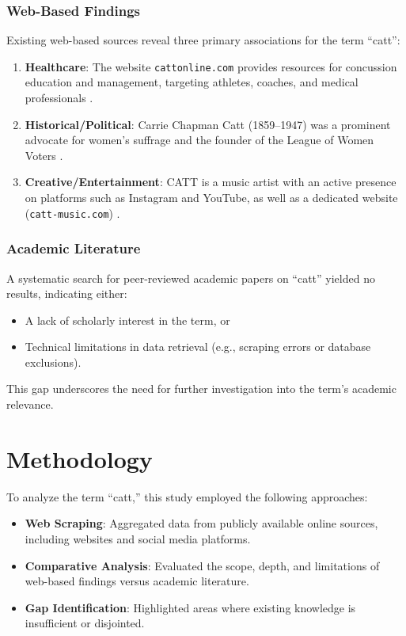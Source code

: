 \documentclass{article}
\begin{document}
\subsubsection{Web-Based Findings}
Existing web-based sources reveal three primary associations for the term ``catt'':
\begin{enumerate}
    \item \textbf{Healthcare}: The website \texttt{cattonline.com} provides resources for concussion education and management, targeting athletes, coaches, and medical professionals \cite{cattonline}.
    \item \textbf{Historical/Political}: Carrie Chapman Catt (1859--1947) was a prominent advocate for women's suffrage and the founder of the League of Women Voters \cite{catt_suffrage}.
    \item \textbf{Creative/Entertainment}: CATT is a music artist with an active presence on platforms such as Instagram and YouTube, as well as a dedicated website (\texttt{catt-music.com}) \cite{catt_music}.
\end{enumerate}

\subsubsection{Academic Literature}
A systematic search for peer-reviewed academic papers on ``catt'' yielded no results, indicating either:
\begin{itemize}
    \item A lack of scholarly interest in the term, or
    \item Technical limitations in data retrieval (e.g., scraping errors or database exclusions).
\end{itemize}
This gap underscores the need for further investigation into the term's academic relevance.

\section{Methodology}
To analyze the term ``catt,'' this study employed the following approaches:
\begin{itemize}
    \item \textbf{Web Scraping}: Aggregated data from publicly available online sources, including websites and social media platforms.
    \item \textbf{Comparative Analysis}: Evaluated the scope, depth, and limitations of web-based findings versus academic literature.
    \item \textbf{Gap Identification}: Highlighted areas where existing knowledge is insufficient or disjointed.
\end{itemize}
\end{document}
